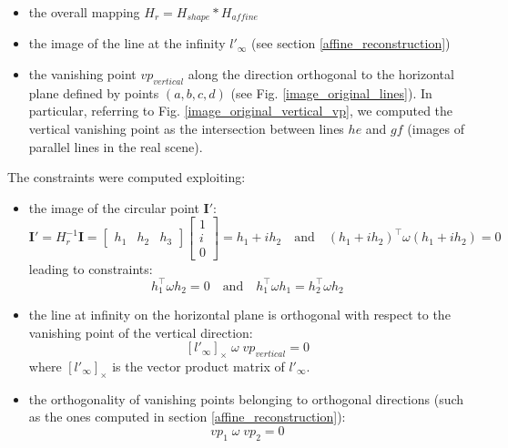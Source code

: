\documentclass[11pt, oneside]{article}
\begin{document}
\begin{itemize}
	\item the overall mapping $ H_{r} = H_{shape} * H_{affine} $
	\item the image of the line at the infinity $l'_\infty$ (see section \ref{affine_reconstruction})
	\item the vanishing point $vp_{vertical}$ along the direction orthogonal to the horizontal plane defined by points $(a, b, c, d)$ (see Fig. \ref{image_original_lines}). In particular, referring to Fig. \ref{image_original_vertical_vp}, we computed the vertical vanishing point as the intersection between lines $he$ and $gf$ (images of parallel lines in the real scene). 
\end{itemize}
The constraints were computed exploiting:
\begin{itemize}
	\item the image of the circular point $\textbf{I}'$:
	\begin{equation}
		\textbf{I}' = H_r^{-1} \textbf{I} =
		\begin{bmatrix}
			h_1 & h_2 & h_3
		\end{bmatrix}
		\begin{bmatrix}
			1 \\ i \\ 0
		\end{bmatrix}
		= h_1 + ih_2
		\quad \text{and} \quad (h_1 + ih_2)^\intercal \omega (h_1 + ih_2) = 0	
	\end{equation}
	leading to constraints:
	\begin{equation}
		h_1^\intercal \omega h_2 = 0 \quad \text{and} \quad h_1^\intercal \omega h_1 = h_2^\intercal \omega h_2
	\end{equation}
	\item the line at infinity on the horizontal plane is orthogonal with respect to the vanishing point of the vertical direction:
	\begin{equation} \label{eqn:line_vp}
		[l'_{\infty}]_\times\; \omega\; vp_{vertical} = 0
	\end{equation}
	where $[l'_{\infty}]_\times$ is the vector product matrix of $l'_{\infty}$.
	\item the orthogonality of vanishing points belonging to orthogonal directions (such as the ones computed in section \ref{affine_reconstruction}):
	\begin{equation}
		vp_1\; \omega\; vp_2 = 0
	\end{equation}
\end{itemize}
\end{document}

